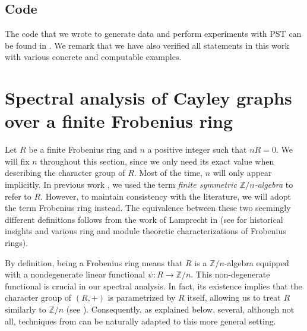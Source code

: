 \documentclass[12pt, a4paper]{amsart}
\theoremstyle{definition}
\numberwithin{equation}{section}
\begin{document}
\subsection{Code}
The code that we wrote to generate data and perform experiments with PST can be found in \cite{nguyen_pst}.  We remark that we have also verified all statements in this work with various concrete and computable examples. 


\section{\textbf{Spectral analysis of Cayley graphs over a finite Frobenius ring}}  \label{sec:spectral}
Let $R$ be a finite Frobenius ring and $n$ a positive integer such that $nR = 0$. We will fix $n$ throughout this section, since we only need its exact value when describing the character group of $R$. Most of the time, $n$ will only appear implicitly.  In previous work \cite{nguyen2024integral, nguyen2025gcd}, we used the term \textit{finite symmetric $\mathbb{Z}/n$-algebra} to refer to $R$. However, to maintain consistency with the literature, we will adopt the term Frobenius ring instead. The equivalence between these two seemingly different definitions follows from the work of Lamprecht in \cite{lamprecht1953allgemeine} (see \cite{honold2001characterization} for historical insights and various ring and module theoretic characterizations of Frobenius rings).



By definition, being a Frobenius ring means that $R$ is a $\mathbb{Z}/n$-algebra equipped with a nondegenerate linear functional $\psi\colon R \to \mathbb{Z}/n$. This non-degenerate functional is crucial in our spectral analysis. In fact, its existence implies that the character group of $(R, +)$ is parametrized by $R$ itself, allowing us to treat $R$ similarly to $\mathbb{Z}/n$ (see \cite[Proposition 2.4]{nguyen2024integral}). Consequently, as explained below, several, although not all, techniques from \cite{bavsic2009perfect, godsil2012state} can be naturally adapted to this more general setting.
\end{document}
